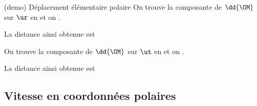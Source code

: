 \documentclass[../../main/main.tex]{subfiles}
\begin{document}
\begin{tcb*}[sidebyside, righthand ratio=.40](demo)
  {Déplacement élémentaire polaire}
  On trouve la composante de $\dd{\OM}$ sur $\ur$ en  et on
  .
  \begin{center}
    La distance ainsi obtenue est 
  \end{center}
  \bigbreak
  On trouve la composante de $\dd{\OM}$ sur $\ut$ en  et on
  .
  \begin{center}
    La distance ainsi obtenue est 
  \end{center}
  \tcblower
  \begin{center}
    \vspace{-15pt}
  \end{center}
\end{tcb*}

\subsection{Vitesse en coordonnées polaires}
\end{document}

